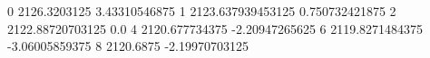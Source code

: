 0 2126.3203125 3.43310546875
1 2123.637939453125 0.750732421875
2 2122.88720703125 0.0
4 2120.677734375 -2.20947265625
6 2119.8271484375 -3.06005859375
8 2120.6875 -2.19970703125
